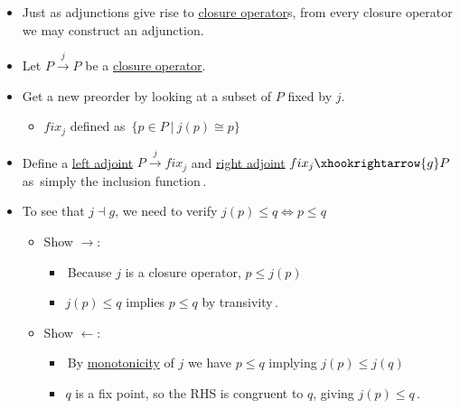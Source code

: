 
\begin{itemize}
    \item Just as adjunctions give rise to \href{doc/1 math/Seven Sketches in Compositionality/Chapter 1: Generative Effects/6 Galois connections/4 Closure operators/1 Closure operator}{closure operator}s, from every closure operator we may construct an adjunction.
    \item Let $P \xrightarrow{j} P$ be a \href{doc/1 math/Seven Sketches in Compositionality/Chapter 1: Generative Effects/6 Galois connections/4 Closure operators/1 Closure operator}{closure operator}.
    \item Get a new preorder by looking at a subset of $P$ fixed by $j$.
          \begin{itemize}
            \item $fix_j$ defined as \,$\{p \in P\ |\ j(p)\cong p\}$\,
          \end{itemize}
    \item Define a \href{doc/1 math/Seven Sketches in Compositionality/Chapter 1: Generative Effects/6 Galois connections/1 Definition and examples/Galois connection}{left adjoint} $P \xrightarrow{j} fix_j$ and \href{doc/1 math/Seven Sketches in Compositionality/Chapter 1: Generative Effects/6 Galois connections/1 Definition and examples/Galois connection}{right adjoint} $fix_j \xhookrightarrow{g} P$ as \,simply the inclusion function\,.
    \item To see that $j \dashv g$, we need to verify $j(p) \leq q \iff p \leq q$
          \begin{itemize}
            \item Show $\rightarrow$:
                  \begin{itemize}
                    \item \,Because $j$ is a closure operator, $p \leq j(p)$
                    \item $j(p) \leq q$ implies $p \leq q$ by transivity\,.
                  \end{itemize}
            \item Show $\leftarrow$:
                  \begin{itemize}
                    \item \,By \href{doc/1 math/Seven Sketches in Compositionality/Chapter 1: Generative Effects/4 Monotone maps/1 Monotone map}{monotonicity} of $j$ we have $p \leq q$ implying $j(p) \leq j(q)$
                    \item  $q$ is a fix point, so the RHS is congruent to $q$, giving $j(p) \leq q$\,.
                  \end{itemize}
          \end{itemize}
  \end{itemize}